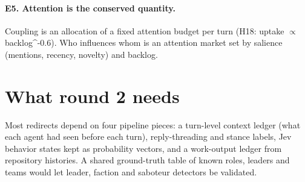 \documentclass[aps,pre,reprint,10pt,nofootinbib]{revtex4-2}
\begin{document}
\paragraph{E5. Attention is the conserved quantity.} Coupling is an allocation of a fixed attention budget per turn (H18: uptake $\propto$ backlog\textasciicircum{}-0.6). Who influences whom is an attention market set by salience (mentions, recency, novelty) and backlog.
\section*{What round 2 needs}
Most redirects depend on four pipeline pieces: a turn-level context ledger (what each agent had seen before each turn), reply-threading and stance labels, Jev behavior states kept as probability vectors, and a work-output ledger from repository histories. A shared ground-truth table of known roles, leaders and teams would let leader, faction and saboteur detectors be validated.
\end{document}
